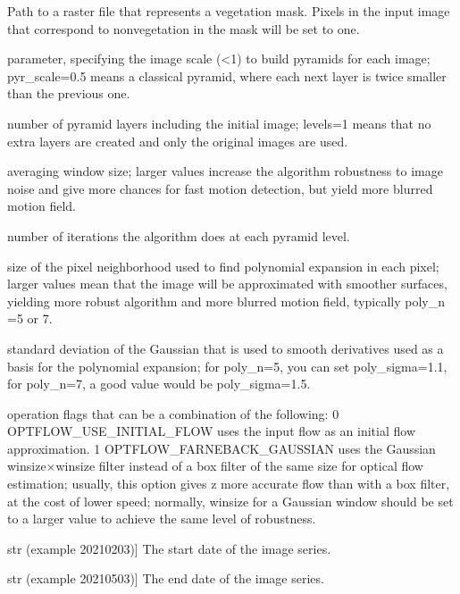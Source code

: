 \documentclass[letterpaper,10pt,english]{sphinxmanual}
\begin{document}
\begin{fulllineitems}
\begin{description}
\sphinxAtStartPar
Path to a raster file that represents a vegetation mask. Pixels in the input image
that correspond to non\sphinxhyphen{}vegetation in the mask will be set to one.

\sphinxAtStartPar
parameter, specifying the image scale (\textless{}1) to build pyramids for each image; pyr\_scale=0.5 means a classical pyramid, where each next layer is twice smaller than the previous one.

\sphinxAtStartPar
number of pyramid layers including the initial image; levels=1 means that no extra layers are created and only the original images are used.

\sphinxAtStartPar
averaging window size; larger values increase the algorithm robustness to image noise and give more chances for fast motion detection, but yield more blurred motion field.

\sphinxAtStartPar
number of iterations the algorithm does at each pyramid level.

\sphinxAtStartPar
size of the pixel neighborhood used to find polynomial expansion in each pixel; 
larger values mean that the image will be approximated with smoother surfaces, 
yielding more robust algorithm and more blurred motion field, typically poly\_n =5 or 7.

\sphinxAtStartPar
standard deviation of the Gaussian that is used to smooth derivatives used as a basis for the polynomial expansion; 
for poly\_n=5, you can set poly\_sigma=1.1, for poly\_n=7, a good value would be poly\_sigma=1.5.

\sphinxAtStartPar
operation flags that can be a combination of the following:
0 OPTFLOW\_USE\_INITIAL\_FLOW uses the input flow as an initial flow approximation.
1 OPTFLOW\_FARNEBACK\_GAUSSIAN uses the Gaussian winsize×winsize filter instead of a box filter of the same size for optical flow estimation; 
usually, this option gives z more accurate flow than with a box filter, at the cost of lower speed; 
normally, winsize for a Gaussian window should be set to a larger value to achieve the same level of robustness.

\sphinxlineitem{start\_date}{[}str (example 20210203){]}
\sphinxAtStartPar
The start date of the image series.

\sphinxlineitem{end\_date}{[}str (example 20210503){]}
\sphinxAtStartPar
The end date of the image series.


\end{description}
\end{fulllineitems}
\end{document}
